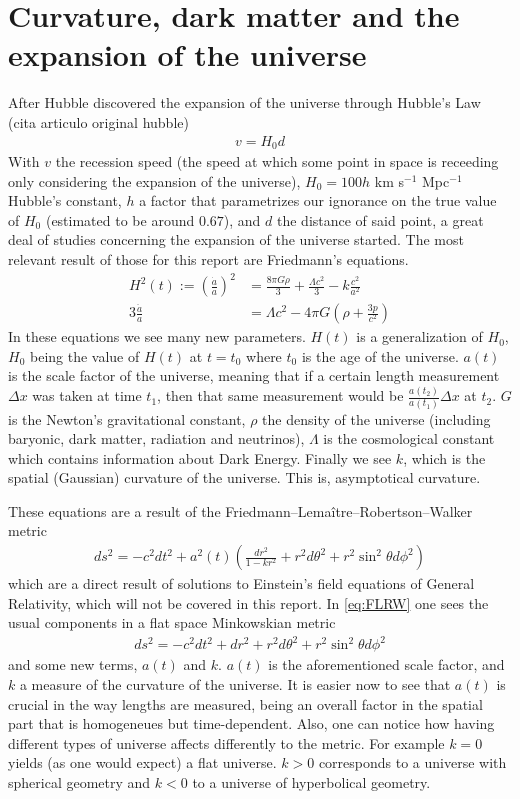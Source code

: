 \section{Curvature, dark matter and the expansion of the universe}
After Hubble discovered the expansion of the universe through Hubble's Law (cita articulo original hubble)
\begin{align}
	v = H_0 d
	\label{eq:ley-hubble}
\end{align}
With $v$ the recession speed (the speed at which some point in space is receeding only considering the expansion of the universe), $H_0=100h$ km s$^{-1}$ Mpc$^{-1}$ Hubble's constant, $h$ a factor that parametrizes our ignorance on the true value of $H_0$ (estimated to be around $0.67$), and $d$ the distance of said point, a great deal of studies concerning the expansion of the universe started. The most relevant result of those for this report are Friedmann's equations.
\begin{align}
	H^2(t) := \left(\frac{\dot a}{a}\right)^2 &=  \frac{8\pi G \rho}{3} +\frac{\Lambda c^2}{3} - k \frac{c^2}{a^2}
	\label{eq:1a-friedmann}\\
	3 \frac{\ddot a}{a} &= \Lambda c^2 - 4\pi G \left( \rho + \frac{3p}{c^2} \right) 
	\label{eq:2a-friedmann}
\end{align}
In these equations we see many new parameters. $H(t)$ is a generalization of $H_0$, $H_0$ being the value of $H(t)$ at $t=t_0$ where $t_0$ is the age of the universe. $a(t)$ is the scale factor of the universe, meaning that if a certain length measurement $\Delta x$ was taken at time $t_1$, then that same measurement would be $\frac{a(t_2)}{a(t_1)}\Delta x$ at $t_2$. $G$ is the Newton's gravitational constant, $\rho$ the density of the universe (including baryonic, dark matter, radiation and neutrinos), $\Lambda$ is the cosmological constant which contains information about Dark Energy. Finally we see $k$, which is the spatial (Gaussian) curvature of the universe. This is, asymptotical curvature.

These equations are a result of the Friedmann–Lemaître–Robertson–Walker metric 
\begin{align}
	ds ^2 = -c^2 dt^2  + a^2(t) \left( \frac{dr^2}{1-kr^2} +r^2d\theta ^2 + r^2 \sin^2\theta d\phi^2\right) 
	\label{eq:FLRW}
\end{align}which are a direct result of solutions to Einstein's field equations of General Relativity, which will not be covered in this report. In \eqref{eq:FLRW} one sees the usual components in a flat space Minkowskian metric 
\begin{align}
	ds^2 = -c^2dt^2 + dr^2 + r^2d\theta^2 + r^2 \sin^2\theta d\phi^2
\end{align} and some new terms, $a(t)$ and $k$. $a(t)$ is the aforementioned scale factor, and $k$ a measure of the curvature of the universe. It is easier now to see that $a(t)$ is crucial in the way lengths are measured, being an overall factor in the spatial part that is homogeneues but time-dependent. Also, one can notice how having different types of universe affects differently to the metric. For example $k=0$ yields (as one would expect) a flat universe. $k>0$ corresponds to a universe with spherical geometry and $k<0$ to a universe of hyperbolical geometry.

